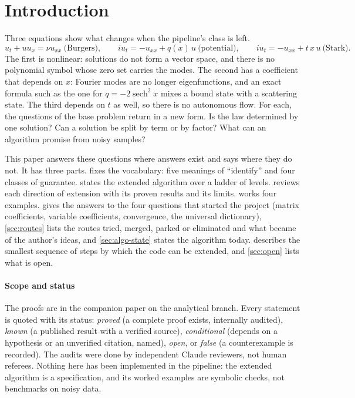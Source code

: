 \documentclass[11pt]{article}
\theoremstyle{plain}
\theoremstyle{definition}
\theoremstyle{remark}
\begin{document}
\section{Introduction}\label{sec:intro}
Three equations show what changes when the pipeline's class is left.
\begin{equation}\label{eq:three}
u_t+uu_x=\nu u_{xx}\ \text{(Burgers)},\qquad
iu_t=-u_{xx}+q(x)\,u\ \text{(potential)},\qquad
iu_t=-u_{xx}+t\,x\,u\ \text{(Stark)}.
\end{equation}
The first is nonlinear: solutions do not form a vector space, and there is no polynomial symbol whose zero set carries the modes. The second
has a coefficient that depends on $x$: Fourier modes are no longer eigenfunctions, and an exact formula such as the one for
$q=-2\operatorname{sech}^2x$ mixes a bound state with a scattering state. The third depends on $t$ as well, so there is no autonomous
flow. For each, the questions of the base problem return in a new form. Is the law determined by one solution? Can a solution be split by
term or by factor? What can an algorithm promise from noisy samples?

This paper answers these questions where answers exist and says where they do not. It has three parts.  fixes the
vocabulary: five meanings of ``identify'' and four classes of guarantee.  states the extended algorithm over a ladder of
levels.  reviews each direction of extension with its proven results and its limits.  works four
examples.  gives the answers to the four questions that started the project (matrix coefficients, variable coefficients, convergence, the universal dictionary), \cref{sec:routes} lists the routes tried, merged, parked or eliminated and what became of the author's ideas, and \cref{sec:algo-state} states the algorithm today.  describes the smallest sequence of steps by which the code can be extended, and \cref{sec:open} lists what is open.

\paragraph{Scope and status} The proofs are in the companion paper on the analytical branch. Every statement is quoted with its status:
\emph{proved} (a complete proof exists, internally audited), \emph{known} (a published result with a verified source), \emph{conditional} (depends on a hypothesis or an unverified citation, named),
\emph{open}, or \emph{false} (a counterexample is recorded). The audits were done by independent Claude reviewers, not human referees.
Nothing here has been implemented in the pipeline: the extended algorithm is a specification, and its worked examples are symbolic checks, not
benchmarks on noisy data.
\end{document}
